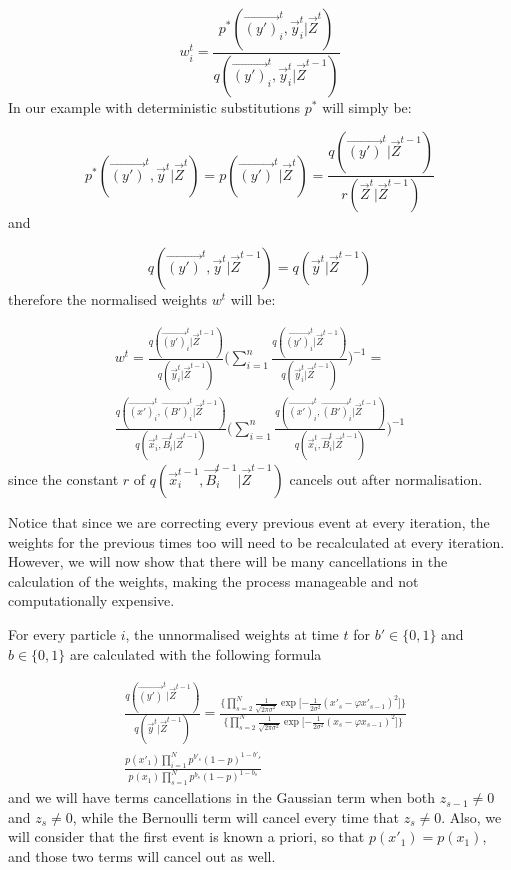 \[
w^{t}_i = \frac{p^*(\vec{(y')}^{t}_i, \vec{y}^{t}_i | \vec{Z}^{t})} {q(\vec{(y')}^{t}_i, \vec{y}^{t}_i|\vec{Z}^{t-1})}
\]
In our example with deterministic substitutions $p^*$ will simply be:

\[
p^*(\vec{(y')}^{t}, \vec{y}^{t} | \vec{Z}^{t}) = p(\vec{(y')}^{t} | \vec{Z}^{t}) = \frac{ q(\vec{(y')}^{t}|\vec{Z}^{t-1})} {r(\vec{Z}^{t} | \vec{Z}^{t-1})}
\]
and

\[
q(\vec{(y')}^{t}, \vec{y}^{t} | \vec{Z}^{t-1}) = q(\vec{y}^{t} | \vec{Z}^{t-1})
\]
therefore the normalised weights $w^t$ will be:

\begin{multline*}
w^{t} = \frac{q(\vec{(y')}^{t}_i | \vec{Z}^{t-1}) }{q(\vec{y}^{t}_i | \vec{Z}^{t-1})}\Bigg( \sum_{i=1}^n  \frac{q(\vec{(y')}^{t}_i | \vec{Z}^{t-1}) }{q(\vec{y}^{t}_i | \vec{Z}^{t-1})}\Bigg)^{-1} = \\
\frac{q(\vec{(x')}^{t}_i, \vec{(B')}^{t}_i | \vec{Z}^{t-1}) }{q(\vec{x}^{t}_i, \vec{B}^{t}_i | \vec{Z}^{t-1})}\Bigg( \sum_{i=1}^n \frac{q(\vec{(x')}^{t}_i, \vec{(B')}^{t}_i | \vec{Z}^{t-1}) }{q(\vec{x}^{t}_i, \vec{B}^{t}_i | \vec{Z}^{t-1})}\Bigg)^{-1}
\end{multline*}
since the constant $r$ of $q(\vec{x}^{t-1}_i,\vec{B}^{t-1}_i | \vec{Z}^{t-1})$ cancels out after normalisation.

Notice that since we are correcting every previous event at every iteration, the weights for the previous times too will need to be recalculated at every iteration. However, we will now show that there will be many cancellations in the calculation of the weights, making the process manageable and not computationally expensive.

For every particle $i$, the unnormalised weights at time $t$ for $b' \in \{0,1\}$ and $b \in \{0,1\}$ are calculated with the following formula

\begin{align} \label{eq:2}
&\frac{q(\vec{(y')}^{t} | \vec{Z}^{t-1}) }{q(\vec{y}^{t} | \vec{Z}^{t-1})} =
\frac{\bigg \{ \prod_{s=2}^{N}  \frac{1}{\sqrt{2 \pi \sigma^{2}}} \exp \bigg [ { - \frac{1}{2 \sigma^{2}} }  (x'_s - \varphi x'_{s-1})^{2} \bigg ] \bigg \} }{\bigg \{ \prod_{s=2}^{N}  \frac{1}{\sqrt{2 \pi \sigma^{2}}} \exp \bigg [ { - \frac{1}{2 \sigma^{2}} }  (x_s - \varphi x_{s-1})^{2} \bigg ] \bigg \} } \nonumber \\
&\frac{p(x'_{1}) \prod_{i=1}^{N} p^{b'_s} (1 - p)^{1-b'_s}  }{ p(x_{1}) \prod_{s=1}^{N} p^{b_s} (1 - p)^{1-b_s} }
\end{align}
and we will have terms cancellations in the Gaussian term when both $z_{s-1} \neq 0$ and $z_s \neq 0$, while the Bernoulli term will cancel every time that $z_s \neq 0$. Also, we will consider that the first event is known a priori, so that $p(x'_1)=p(x_1)$, and those two terms will cancel out as well.

